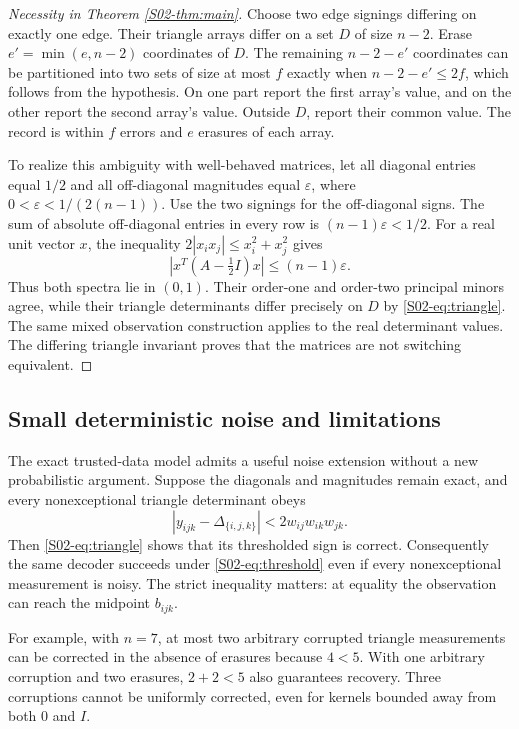 \documentclass[11pt,a4paper]{article}
\theoremstyle{definition}\newtheorem{definition}[theorem]{Definition}
\theoremstyle{remark}\newtheorem{remark}[theorem]{Remark}
\numberwithin{equation}{section}
\begin{document}
\begin{proof}[Necessity in Theorem \ref{S02-thm:main}]
Choose two edge signings differing on exactly one edge. Their triangle arrays differ on a set $D$ of size $n-2$. Erase $e'=\min(e,n-2)$ coordinates of $D$. The remaining $n-2-e'$ coordinates can be partitioned into two sets of size at most $f$ exactly when $n-2-e'\le2f$, which follows from the hypothesis. On one part report the first array's value, and on the other report the second array's value. Outside $D$, report their common value. The record is within $f$ errors and $e$ erasures of each array.

To realize this ambiguity with well-behaved matrices, let all diagonal entries equal $1/2$ and all off-diagonal magnitudes equal $\varepsilon$, where $0<\varepsilon<1/(2(n-1))$. Use the two signings for the off-diagonal signs. The sum of absolute off-diagonal entries in every row is $(n-1)\varepsilon<1/2$. For a real unit vector $x$, the inequality $2|x_ix_j|\le x_i^2+x_j^2$ gives
\[
 \left|x^T(A-\tfrac12I)x\right|\le(n-1)\varepsilon.
\]
Thus both spectra lie in $(0,1)$. Their order-one and order-two principal minors agree, while their triangle determinants differ precisely on $D$ by \eqref{S02-eq:triangle}. The same mixed observation construction applies to the real determinant values. The differing triangle invariant proves that the matrices are not switching equivalent.
\end{proof}

\subsection{Small deterministic noise and limitations}\label{S02-sec-5}
The exact trusted-data model admits a useful noise extension without a new probabilistic argument. Suppose the diagonals and magnitudes remain exact, and every nonexceptional triangle determinant obeys
\[
 |y_{ijk}-\Delta_{\{i,j,k\}}|<2w_{ij}w_{ik}w_{jk}.
\]
Then \eqref{S02-eq:triangle} shows that its thresholded sign is correct. Consequently the same decoder succeeds under \eqref{S02-eq:threshold} even if every nonexceptional measurement is noisy. The strict inequality matters: at equality the observation can reach the midpoint $b_{ijk}$.

For example, with $n=7$, at most two arbitrary corrupted triangle measurements can be corrected in the absence of erasures because $4<5$. With one arbitrary corruption and two erasures, $2+2<5$ also guarantees recovery. Three corruptions cannot be uniformly corrected, even for kernels bounded away from both $0$ and $I$.
\end{document}
